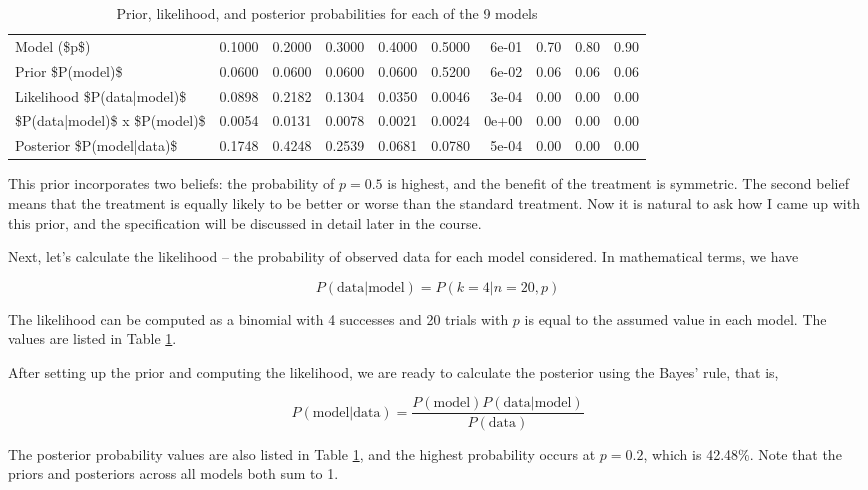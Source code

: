 \documentclass[]{book}
\theoremstyle{definition}
\theoremstyle{definition}
\theoremstyle{remark}
\begin{document}
\begin{table}

\caption{\label{tab:RU-486prior}Prior, likelihood, and posterior probabilities for each of the 9 models}
\centering
\begin{tabular}[t]{lrrrrrrrrr}
\toprule
Model (\$p\$) & 0.1000 & 0.2000 & 0.3000 & 0.4000 & 0.5000 & 6e-01 & 0.70 & 0.80 & 0.90\\
Prior \$P(model)\$ & 0.0600 & 0.0600 & 0.0600 & 0.0600 & 0.5200 & 6e-02 & 0.06 & 0.06 & 0.06\\
Likelihood \$P(data|model)\$ & 0.0898 & 0.2182 & 0.1304 & 0.0350 & 0.0046 & 3e-04 & 0.00 & 0.00 & 0.00\\
\$P(data|model)\$ x \$P(model)\$ & 0.0054 & 0.0131 & 0.0078 & 0.0021 & 0.0024 & 0e+00 & 0.00 & 0.00 & 0.00\\
Posterior \$P(model|data)\$ & 0.1748 & 0.4248 & 0.2539 & 0.0681 & 0.0780 & 5e-04 & 0.00 & 0.00 & 0.00\\
\bottomrule
\end{tabular}
\end{table}

This prior incorporates two beliefs: the probability of \(p = 0.5\) is
highest, and the benefit of the treatment is symmetric. The second
belief means that the treatment is equally likely to be better or worse
than the standard treatment. Now it is natural to ask how I came up with
this prior, and the specification will be discussed in detail later in
the course.

Next, let's calculate the likelihood -- the probability of observed data
for each model considered. In mathematical terms, we have

\[ P(\text{data}|\text{model}) = P(k = 4 | n = 20, p)\]

The likelihood can be computed as a binomial with 4 successes and 20
trials with \(p\) is equal to the assumed value in each model. The
values are listed in Table \ref{tab:RU-486prior}.

After setting up the prior and computing the likelihood, we are ready to
calculate the posterior using the Bayes' rule, that is,

\[P(\text{model}|\text{data}) = \frac{P(\text{model})P(\text{data}|\text{model})}{P(\text{data})}\]

The posterior probability values are also listed in Table
\ref{tab:RU-486prior}, and the highest probability occurs at \(p=0.2\),
which is 42.48\%. Note that the priors and posteriors across all models
both sum to 1.
\end{document}
